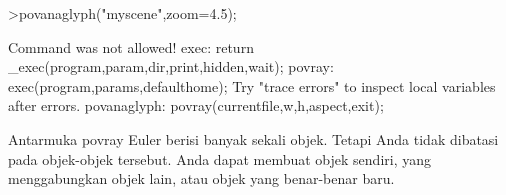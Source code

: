 \documentclass[12pt,Times new roman,letterpaper]{book}
\begin{document}
\begin{eulernootebook}
\begin{eulercomment}
\begin{eulercomment}
\begin{eulernootebook}
\begin{eulercomment}
\begin{eulercomment}
\begin{eulercomment}
\begin{eulercomment}
\begin{eulercomment}
\begin{eulercomment}
\begin{eulercomment}
\begin{eulernotebook}
\begin{eulerprompt}
>povanaglyph("myscene",zoom=4.5);
\end{eulerprompt}
\begin{euleroutput}
  Command was not allowed!
  exec:
      return _exec(program,param,dir,print,hidden,wait);
  povray:
      exec(program,params,defaulthome);
  Try "trace errors" to inspect local variables after errors.
  povanaglyph:
      povray(currentfile,w,h,aspect,exit); 
\end{euleroutput}
\begin{eulercomment}
Antarmuka povray Euler berisi banyak sekali objek. Tetapi Anda tidak
dibatasi pada objek-objek tersebut. Anda dapat membuat objek sendiri,
yang menggabungkan objek lain, atau objek yang benar-benar baru.


\end{eulercomment}
\end{eulernotebook}
\end{eulercomment}
\end{eulercomment}
\end{eulercomment}
\end{eulercomment}
\end{eulercomment}
\end{eulercomment}
\end{eulercomment}
\end{eulernootebook}
\end{eulercomment}
\end{eulercomment}
\end{eulernootebook}
\end{document}
